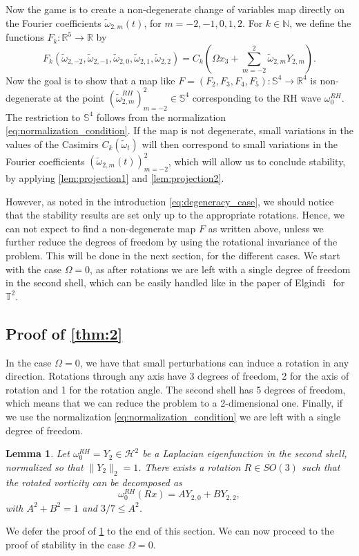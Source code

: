 \documentclass{amsart}
\newtheorem{lemma}{Lemma}[section]
\newtheorem{lemma}{Lemma}[section]  %
\def\enne{{\mathbb{N}}}
\begin{document}
Now the game is to create a non-degenerate change of variables map directly on the Fourier coefficients $\tilde\omega_{2,m}(t)$, for $m=-2,-1,0,1,2$. For $k\in\enne$, we define the functions $F_k:\mathbb{R}^5 \to \mathbb{R}$ by
\[
    F_k(\tilde\omega_{2,-2}, \tilde\omega_{2,-1}, \tilde\omega_{2,0}, \tilde\omega_{2,1}, \tilde\omega_{2,2}) = C_k\left(\Omega x_3+\sum_{m=-2}^2 \tilde\omega_{2,m} Y_{2,m}\right).
\]
Now the goal is to show that a map like $F = (F_2, F_3, F_4, F_5): \mathbb{S}^4 \to \mathbb{R}^4$ is non-degenerate at the point $(\tilde\omega_{2,m}^{RH})_{m=-2}^2\in \mathbb{S}^4$ corresponding to the RH wave $\omega_0^{RH}$. The restriction to $\mathbb{S}^4$ follows from the normalization \cref{eq:normalization_condition}. If the map is not degenerate, small variations in the values of the Casimirs $C_k(\tilde\omega_t)$ will then correspond to small variations in the Fourier coefficients $(\tilde\omega_{2,m}(t))_{m=-2}^2$, which will allow us to conclude stability, by applying \cref{lem:projection1} and \cref{lem:projection2}.

However, as noted in the introduction \eqref{eq:degeneracy_case}, we should notice that the stability results are set only up to the appropriate rotations. Hence, we can not expect to find a non-degenerate map $F$ as written above, unless we further reduce the degrees of freedom by using the rotational invariance of the problem. This will be done in the next section, for the different cases. We start with the case $\Omega=0$, as after rotations we are left with a single degree of freedom in the second shell, which can be easily handled like in the paper of Elgindi~\cite{elgindi2023remarkstabilityenergymaximizers} for $\mathbb{T}^2$.

\subsection{Proof of \cref{thm:2}} \label{sec:thm2}
In the case $\Omega=0$, we have that small perturbations can induce a rotation in any direction. Rotations through any axis have 3 degrees of freedom, 2 for the axis of rotation and 1 for the rotation angle.
The second shell has 5 degrees of freedom, which means that we can reduce the problem to a 2-dimensional one. Finally, if we use the normalization \eqref{eq:normalization_condition} we are left with a single degree of freedom.
\begin{lemma}
    Let $\omega_0^{RH} = Y_2 \in \mathcal{H}^2$ be a Laplacian eigenfunction in the second shell, normalized so that $\|Y_2\|_2 = 1$. There exists a rotation $R \in SO(3)$ such that the rotated vorticity can be decomposed as
    $$
        \omega_0^{RH}(Rx)=A Y_{2,0} + B Y_{2,2},
    $$ 
    with $A^2 + B^2 = 1$ and $3/7\le A^2 $.
    \label{lemma:rotation_case_Omega0}
\end{lemma}
We defer the proof of \cref{lemma:rotation_case_Omega0} to the end of this section.
We can now proceed to the proof of stability in the case $\Omega=0$.
\end{document}
